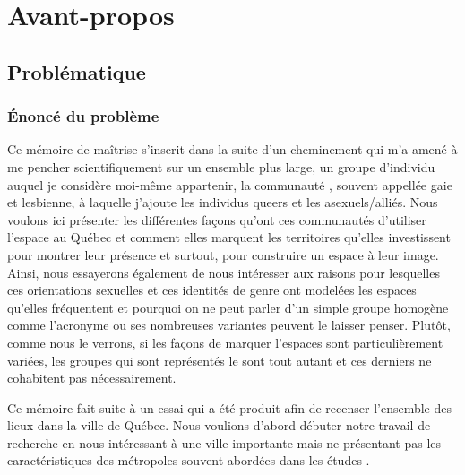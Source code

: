 \chapter*{Avant-propos}         %

\section{Problématique}
\label{sec:problematique}


\subsection{Énoncé du problème}
\label{sub:enonce_du_probleme}

Ce mémoire de maîtrise s'inscrit dans la suite d'un cheminement qui m'a amené à me pencher scientifiquement sur un ensemble plus large, un groupe d'individu auquel je considère moi-même appartenir, la communauté \lgbt{}, souvent appellée gaie et lesbienne, à laquelle j'ajoute les individus queers et les asexuels/alliés.
Nous voulons ici présenter les différentes façons qu'ont ces communautés d'utiliser l'espace au Québec et comment elles marquent les territoires qu'elles investissent pour montrer leur présence et surtout, pour construire un espace à leur image.
Ainsi, nous essayerons également de nous intéresser aux raisons pour lesquelles ces orientations sexuelles et ces identités de genre ont modelées les espaces qu'elles fréquentent et pourquoi on ne peut parler d'un simple groupe homogène comme l'acronyme \lgbt{} ou ses nombreuses variantes peuvent le laisser penser.
Plutôt, comme nous le verrons, si les façons de marquer l'espaces sont particulièrement variées, les groupes qui sont représentés le sont tout autant et ces derniers ne cohabitent pas nécessairement.

Ce mémoire fait suite à un essai qui a été produit afin de recenser l'ensemble des lieux \lgbt{} dans la ville de Québec.
Nous voulions d'abord débuter notre travail de recherche en nous intéressant à une ville importante mais ne présentant pas les caractéristiques des métropoles souvent abordées dans les études \lgbt{}.

